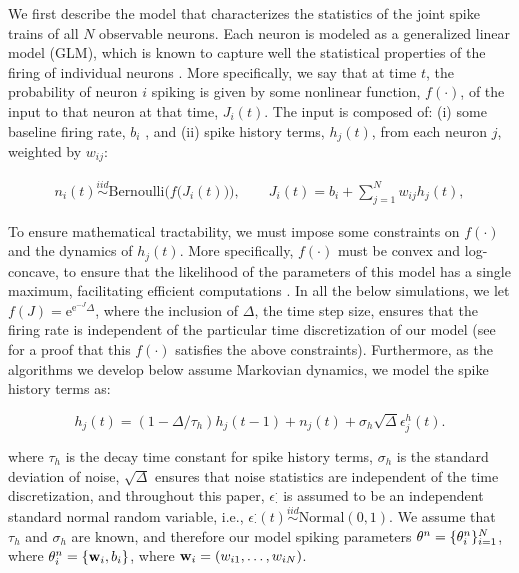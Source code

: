 We first describe the model that characterizes the statistics of the joint spike trains of all $N$ observable neurons.  Each neuron is modeled as a generalized linear model (GLM), which is known to capture well the statistical properties of the firing of individual neurons \cite{PILL07, PAN03d, Wu07, Rigat06, OKA05}.  More specifically, we say that at time $t$, the probability of neuron $i$ spiking is given by some nonlinear function, $f(\cdot)$, of the input to that neuron at that time, $J_i(t)$.  The input is composed of: (i) some baseline firing rate, $b_i$%
, and (ii) spike history terms, $h_j(t)$, from each neuron $j$, weighted by $w_{ij}$:

\begin{equation} \label{eqn:glm:definition}
\begin{array}{l}
n_i(t)\overset{iid}{\sim} \text{Bernoulli}\big(f\big(J_i(t)\big)\big), \qquad %
J_i(t)=b_i+\sum \limits_{j=1}^{N}  w_{ij} h_{j}(t), %
\end{array}
\end{equation}

\noindent To ensure mathematical tractability, we must impose some constraints on $f(\cdot)$ and the dynamics of $h_j(t)$.  More specifically, $f(\cdot)$ must be convex and log-concave, to ensure that the likelihood of the parameters of this model has a single maximum, facilitating efficient computations \cite{PAN03d}.  In all the below simulations, we let $f(J)=\text{e}^{\text{e}^{-J}\Delta}$, where the inclusion of $\Delta$, the time step size, ensures that the firing rate is independent of the particular time discretization of our model (see \cite{??} for a proof that this $f(\cdot)$ satisfies the above constraints).  Furthermore, as the algorithms we develop below assume Markovian dynamics, we model the spike history terms as:

\begin{equation} \label{eqn:h:definition}
h_j(t) = (1- \Delta/\tau_h) h_j(t-1) +n_j(t) + \sigma_h \sqrt{\Delta} \epsilon^h_j(t).
\end{equation}

\noindent where $\tau_h$ is the decay time constant for spike history terms, $\sigma_h$ is the standard deviation of noise, $\sqrt{\Delta}$ ensures that noise statistics are independent of the time discretization, and throughout this paper, $\epsilon_\cdot^\cdot$ is assumed to be an independent standard normal random variable, i.e., $\epsilon_{\cdot}^{\cdot}(t) \overset{iid}{\sim} \text{Normal}(0,1)$.  We assume that $\tau_h$ and $\sigma_h$ are known, and therefore our model spiking parameters $\mathbf{\theta}^n=\{\mathbf{\theta}^n_i\}_{i=1}^N$, where $\mathbf{\theta}^n_i=\{\mathbf{w}_i,b_i\}$, where $\mathbf{w}_i=(w_{i1},\ldots, w_{iN})$.
%

